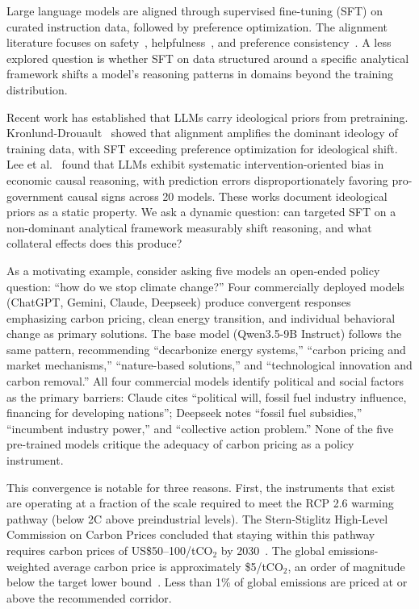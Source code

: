\documentclass[11pt]{article}
\begin{document}
Large language models are aligned through supervised fine-tuning (SFT) on curated instruction data, followed by preference optimization. The alignment literature focuses on safety~\cite{bai2022constitutional}, helpfulness~\cite{ouyang2022training}, and preference consistency~\cite{rafailov2023direct}. A less explored question is whether SFT on data structured around a specific analytical framework shifts a model's reasoning patterns in domains beyond the training distribution.

Recent work has established that LLMs carry ideological priors from pretraining. Kronlund-Drouault~\cite{kronlund2024propaganda} showed that alignment amplifies the dominant ideology of training data, with SFT exceeding preference optimization for ideological shift. Lee et al.~\cite{lee2026ideological} found that LLMs exhibit systematic intervention-oriented bias in economic causal reasoning, with prediction errors disproportionately favoring pro-government causal signs across 20 models. These works document ideological priors as a static property. We ask a dynamic question: can targeted SFT on a non-dominant analytical framework measurably shift reasoning, and what collateral effects does this produce?

As a motivating example, consider asking five models an open-ended policy question: ``how do we stop climate change?'' Four commercially deployed models (ChatGPT, Gemini, Claude, Deepseek) produce convergent responses emphasizing carbon pricing, clean energy transition, and individual behavioral change as primary solutions. The base model (Qwen3.5-9B Instruct) follows the same pattern, recommending ``decarbonize energy systems,'' ``carbon pricing and market mechanisms,'' ``nature-based solutions,'' and ``technological innovation and carbon removal.'' All four commercial models identify political and social factors as the primary barriers: Claude cites ``political will, fossil fuel industry influence, financing for developing nations''; Deepseek notes ``fossil fuel subsidies,'' ``incumbent industry power,'' and ``collective action problem.'' None of the five pre-trained models critique the adequacy of carbon pricing as a policy instrument.

This convergence is notable for three reasons. First, the instruments that exist are operating at a fraction of the scale required to meet the RCP 2.6 warming pathway (below 2C above preindustrial levels). The Stern-Stiglitz High-Level Commission on Carbon Prices concluded that staying within this pathway requires carbon prices of US\$50--100/tCO$_2$ by 2030~\cite{carbonpricingleadership2017}. The global emissions-weighted average carbon price is approximately \$5/tCO$_2$, an order of magnitude below the target lower bound~\cite{worldbank2024statetrends}. Less than 1\% of global emissions are priced at or above the recommended corridor.
\end{document}
